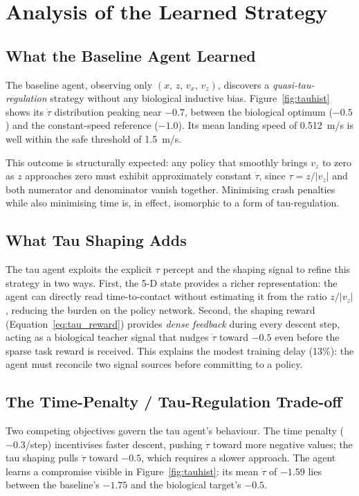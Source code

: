\chapter{Analysis of the Learned Strategy}
\label{ch:analysis}

\section{What the Baseline Agent Learned}
\label{sec:anal_baseline}

The baseline agent, observing only $(x,\, z,\, v_x,\, v_z)$, discovers a
\emph{quasi-tau-regulation} strategy without any biological inductive bias.
Figure~\ref{fig:tauhist} shows its $\dot{\tau}$ distribution peaking near $-0.7$,
between the biological optimum ($-0.5$) and the constant-speed reference ($-1.0$).
Its mean landing speed of 0.512~m/s is well within the safe threshold of 1.5~m/s.

This outcome is structurally expected: any policy that smoothly brings $v_z$ to zero
as $z$ approaches zero must exhibit approximately constant $\dot{\tau}$, since
$\tau = z / |v_z|$ and both numerator and denominator vanish together.
Minimising crash penalties while also minimising time is, in effect, isomorphic to a
form of tau-regulation.

\section{What Tau Shaping Adds}
\label{sec:anal_tau}

The tau agent exploits the explicit $\tau$ percept and the shaping signal to refine this
strategy in two ways.
First, the 5-D state provides a richer representation: the agent can directly read
time-to-contact without estimating it from the ratio $z / |v_z|$, reducing the
burden on the policy network.
Second, the shaping reward (Equation~\ref{eq:tau_reward}) provides \emph{dense feedback}
during every descent step, acting as a biological teacher signal that nudges
$\dot{\tau}$ toward $-0.5$ even before the sparse task reward is received.
This explains the modest training delay (13\%): the agent must reconcile two signal
sources before committing to a policy.

\section{The Time-Penalty / Tau-Regulation Trade-off}
\label{sec:anal_tradeoff}

Two competing objectives govern the tau agent's behaviour.
The time penalty ($-0.3$/step) incentivises faster descent, pushing $\dot{\tau}$
toward more negative values; the tau shaping pulls $\dot{\tau}$ toward $-0.5$,
which requires a slower approach.
The agent learns a compromise visible in Figure~\ref{fig:tauhist}: its mean
$\dot{\tau}$ of $-1.59$ lies between the baseline's $-1.75$ and the biological
target's $-0.5$.

